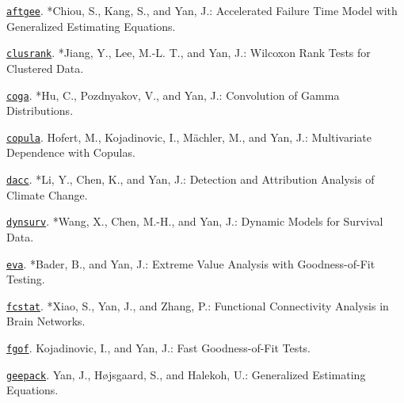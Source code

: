 \begin{Software}

\item \href{https://CRAN.R-project.org/package=aftgee}{\texttt{aftgee}}.
*Chiou, S., Kang, S., and Yan, J.: Accelerated Failure Time
Model with Generalized Estimating Equations.

\item \href{https://CRAN.R-project.org/package=clusrank}{\texttt{clusrank}}.
*Jiang, Y., Lee, M.-L. T., and Yan, J.: Wilcoxon Rank Tests
for Clustered Data.

\item \href{https://CRAN.R-project.org/package=coga}{\texttt{coga}}.
*Hu, C., Pozdnyakov, V., and Yan, J.: Convolution of Gamma
Distributions.

\item \href{https://CRAN.R-project.org/package=copula}{\texttt{copula}}.
Hofert, M., Kojadinovic, I., M\"{a}chler, M., and Yan, J.: Multivariate
Dependence with Copulas.

\item \href{https://CRAN.R-project.org/package=dacc}{\texttt{dacc}}.
*Li, Y., Chen, K., and Yan, J.: Detection and Attribution
Analysis of Climate Change.

\item \href{https://CRAN.R-project.org/package=dynsurv}{\texttt{dynsurv}}.
*Wang, X., Chen, M.-H., and Yan, J.: Dynamic Models for
Survival Data.

\item \href{https://CRAN.R-project.org/package=eva}{\texttt{eva}}.
*Bader, B., and Yan, J.: Extreme Value Analysis with
Goodness-of-Fit Testing.

\item \href{https://github.com/Carol-seven/spice}{\texttt{fcstat}}.
*Xiao, S., Yan, J., and Zhang, P.: Functional Connectivity
Analysis in Brain Networks.

\item \href{https://cran.r-project.org/src/contrib/Archive/fgof/}{\texttt{fgof}}.
Kojadinovic, I., and Yan, J.: Fast Goodness-of-Fit Tests.

\item \href{https://CRAN.R-project.org/package=geepack}{\texttt{geepack}}.
Yan, J., H\o jsgaard, S., and Halekoh, U.: Generalized Estimating
Equations.


\end{Software}
